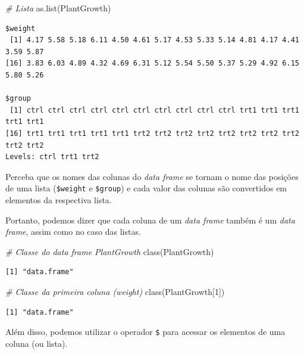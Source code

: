 \documentclass[
  brazilian,
]{book}
\newenvironment{Shaded}{\begin{snugshade}}{\end{snugshade}}
\newcommand{\CommentTok}[1]{\textcolor[rgb]{0.56,0.35,0.01}{\textit{#1}}}
\newcommand{\DecValTok}[1]{\textcolor[rgb]{0.00,0.00,0.81}{#1}}
\newcommand{\FunctionTok}[1]{\textcolor[rgb]{0.00,0.00,0.00}{#1}}
\newcommand{\NormalTok}[1]{#1}
\newcommand{\SpecialCharTok}[1]{\textcolor[rgb]{0.00,0.00,0.00}{#1}}
\begin{document}
\begin{Shaded}
\begin{Highlighting}[]
\CommentTok{\# Lista}
\FunctionTok{as.list}\NormalTok{(PlantGrowth)}
\end{Highlighting}
\end{Shaded}

\begin{verbatim}
$weight
 [1] 4.17 5.58 5.18 6.11 4.50 4.61 5.17 4.53 5.33 5.14 4.81 4.17 4.41 3.59 5.87
[16] 3.83 6.03 4.89 4.32 4.69 6.31 5.12 5.54 5.50 5.37 5.29 4.92 6.15 5.80 5.26

$group
 [1] ctrl ctrl ctrl ctrl ctrl ctrl ctrl ctrl ctrl ctrl trt1 trt1 trt1 trt1 trt1
[16] trt1 trt1 trt1 trt1 trt1 trt2 trt2 trt2 trt2 trt2 trt2 trt2 trt2 trt2 trt2
Levels: ctrl trt1 trt2
\end{verbatim}

Perceba que os nomes das colunas do \emph{data frame} se tornam o nome das posições de uma lista (\texttt{\$weight} e \texttt{\$group}) e cada valor das colunas são convertidos em elementos da respectiva lista.

Portanto, podemos dizer que cada coluna de um \emph{data frame} também é um \emph{data frame}, assim como no caso das listas.

\begin{Shaded}
\begin{Highlighting}[]
\CommentTok{\# Classe do data frame PlantGrowth}
\FunctionTok{class}\NormalTok{(PlantGrowth)}
\end{Highlighting}
\end{Shaded}

\begin{verbatim}
[1] "data.frame"
\end{verbatim}

\begin{Shaded}
\begin{Highlighting}[]
\CommentTok{\# Classe da primeira coluna (weight)}
\FunctionTok{class}\NormalTok{(PlantGrowth[}\DecValTok{1}\NormalTok{])}
\end{Highlighting}
\end{Shaded}

\begin{verbatim}
[1] "data.frame"
\end{verbatim}

Além disso, podemos utilizar o operador \texttt{\$} para acessar os elementos de uma coluna (ou lista).

\begin{Shaded}
\end{Shaded}
\end{document}
